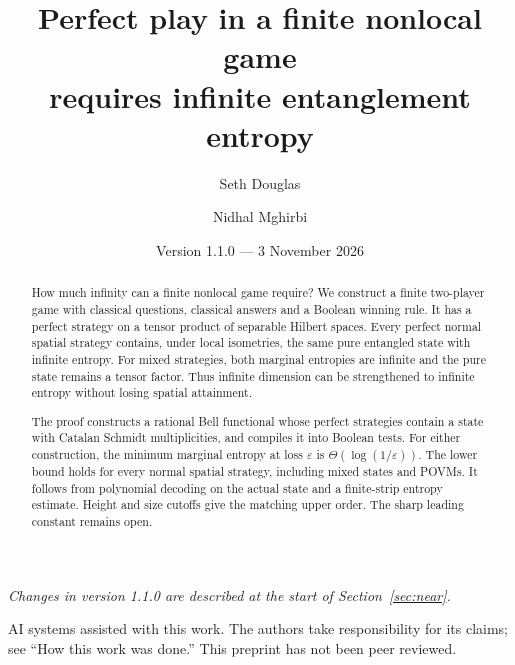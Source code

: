 \documentclass[11pt,a4paper]{article}
\title{Perfect play in a finite nonlocal game\\ requires infinite entanglement entropy}
\author{Seth Douglas \and Nidhal Mghirbi}
\date{Version 1.1.0 --- 3 November 2026}
\theoremstyle{remark}
\begin{document}
\maketitle
\begin{abstract}
How much infinity can a finite nonlocal game require? We construct a finite two-player game with classical questions, classical answers and a Boolean winning rule. It has a perfect strategy on a tensor product of separable Hilbert spaces. Every perfect normal spatial strategy contains, under local isometries, the same pure entangled state with infinite entropy. For mixed strategies, both marginal entropies are infinite and the pure state remains a tensor factor. Thus infinite dimension can be strengthened to infinite entropy without losing spatial attainment.

The proof constructs a rational Bell functional whose perfect strategies contain a state with Catalan Schmidt multiplicities, and compiles it into Boolean tests. For either construction, the minimum marginal entropy at loss $\varepsilon$ is $\Theta(\log(1/\varepsilon))$. The lower bound holds for every normal spatial strategy, including mixed states and POVMs. It follows from polynomial decoding on the actual state and a finite-strip entropy estimate. Height and size cutoffs give the matching upper order. The sharp leading constant remains open.
\end{abstract}
\noindent\textit{Changes in version 1.1.0 are described at the start of Section~\ref{sec:near}.}
\begin{center}\small AI systems assisted with this work. The authors take responsibility for its claims; see ``How this work was done.'' This preprint has not been peer reviewed.\end{center}
\clearpage
{\small\tableofcontents}
\clearpage











\appendix






\end{document}
